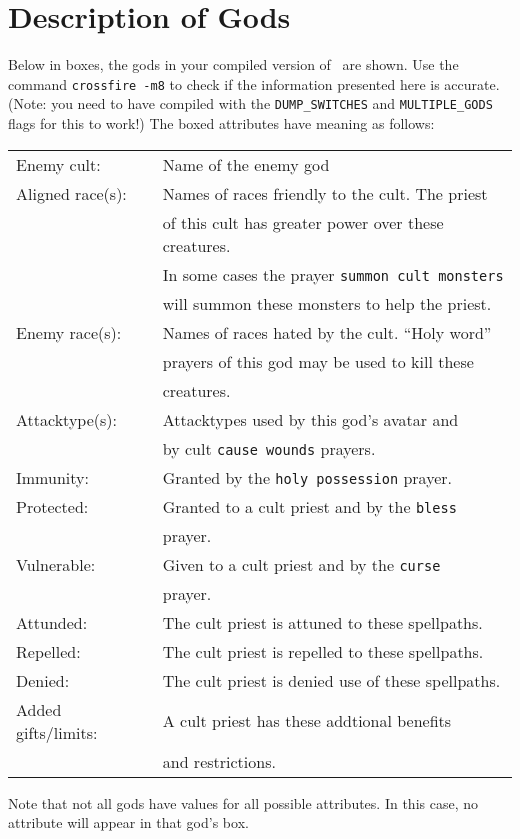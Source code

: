 \chapter{Description of Gods}
\label{app:gods}

Below in boxes, the gods in your compiled version of \cf\ are shown.
Use the command {\tt crossfire -m8} to check if the information
presented here is accurate.
(Note: you need to have compiled with the {\tt DUMP\_SWITCHES} and
{\tt MULTIPLE\_GODS} flags for this to work!) The boxed attributes 
have meaning as follows:
\vskip 12pt
\begin{tabular}{ll} 
Enemy cult: & Name of the enemy god \\
Aligned race(s): & Names of races friendly to the cult. The priest \\
	 & of this cult has greater power over these creatures. \\
	 & In some cases the prayer {\tt summon cult monsters} \\ 
	 & will summon these monsters to help the priest. \\
Enemy race(s): & Names of races hated by the cult. ``Holy word'' \\ 
	 & prayers of this god may be used to kill these \\
	 & creatures. \\
Attacktype(s): & Attacktypes used by this god's avatar and \\
	 & by cult {\tt cause wounds} prayers. \\
Immunity: & Granted by the {\tt holy possession} prayer. \\
Protected: & Granted to a cult priest and by the {\tt bless} \\
	 & prayer. \\
Vulnerable: & Given to a cult priest and by the {\tt curse } \\
	 & prayer. \\
Attunded: & The cult priest is attuned to these spellpaths. \\
Repelled: & The cult priest is repelled to these spellpaths. \\
Denied: & The cult priest is denied use of these spellpaths. \\
Added gifts/limits: & A cult priest has these addtional benefits\\ 
 	& and restrictions. \\
\end{tabular}
\vskip 12pt
Note that not all gods have values for all possible attributes. In
this case, no attribute will appear in that god's box.
 
\begin{longtable}{|p{4cm}p{9cm}|} \hline 

\end{longtable}

